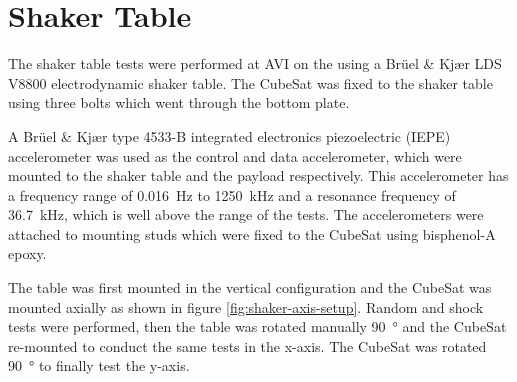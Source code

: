 \documentclass{report}
\begin{document}
\section{Shaker Table}
\label{sec:shaker-table-method}

The shaker table tests were performed at AVI on the  using a Brüel \& Kjær LDS V8800 electrodynamic shaker table. The CubeSat was fixed to the shaker table using three bolts which went through the bottom plate.

A Brüel \& Kjær type 4533-B integrated electronics piezoelectric (IEPE) accelerometer was used as the control and data accelerometer, which were mounted to the shaker table and the payload respectively. This accelerometer has a frequency range of \SI{0.016}{\hertz} to \SI{1250}{\kilo\hertz} and a resonance frequency of \SI{36.7}{\kilo\hertz}, which is well above the range of the tests. The accelerometers were attached to mounting studs which were fixed to the CubeSat using bisphenol-A epoxy.

The table was first mounted in the vertical configuration and the CubeSat was mounted axially as shown in figure \ref{fig:shaker-axis-setup}. Random and shock tests were performed, then the table was rotated manually \SI{90}{\degree} and the CubeSat re-mounted to conduct the same tests in the x-axis. The CubeSat was rotated \SI{90}{\degree} to finally test the y-axis.
\end{document}
